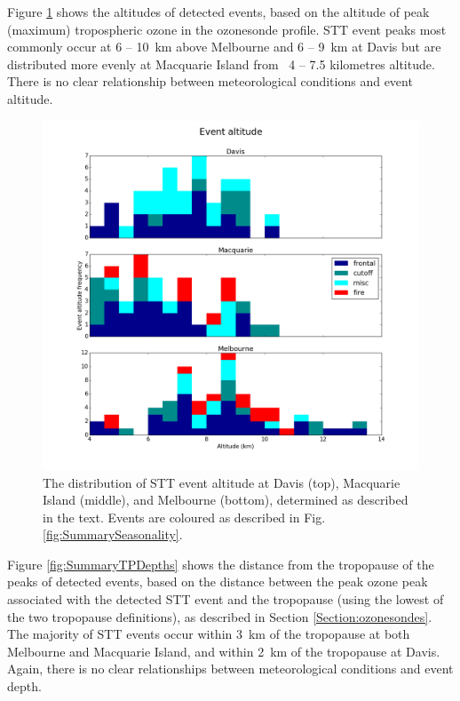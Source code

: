 \documentclass{article}
\begin{document}

  Figure \ref{fig:SummaryAltitudes} shows the altitudes of detected events, based on the altitude of peak (maximum) tropospheric ozone in the ozonesonde profile.
  STT event peaks most commonly occur at 6 -- 10~km above Melbourne and 6 -- 9~km at Davis but are distributed more evenly at Macquarie Island from ~4 -- 7.5 kilometres altitude.
  There is no clear relationship between meteorological conditions and event altitude.
  
  \begin{figure}[!htbp]
    \begin{center}
    \includegraphics[width=0.99\columnwidth]{figures/summary_altitude.png}
    \caption{The distribution of STT event altitude at Davis (top), Macquarie Island (middle), and Melbourne (bottom), determined as described in the text.
    Events are coloured as described in Fig. \ref{fig:SummarySeasonality}.}
    \label{fig:SummaryAltitudes}
    \end{center}
  \end{figure}

  Figure \ref{fig:SummaryTPDepths} shows the distance from the tropopause of the peaks of detected events, based on the distance between the peak ozone peak associated with the detected STT event and the tropopause (using the lowest of the two tropopause definitions), as described in Section \ref{Section:ozonesondes}.
  The majority of STT events occur within 3~km of the tropopause at both Melbourne and Macquarie Island, and within 2~km of the tropopause at Davis. 
  Again, there is no clear relationships between meteorological conditions and event depth.
\end{document}
